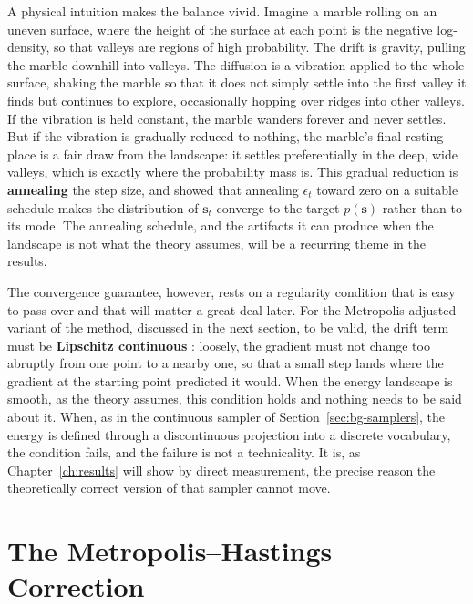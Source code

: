 A physical intuition makes the balance vivid. Imagine a marble rolling on an uneven surface, where the height of the surface at each point is the negative log-density, so that valleys are regions of high probability. The drift is gravity, pulling the marble downhill into valleys. The diffusion is a vibration applied to the whole surface, shaking the marble so that it does not simply settle into the first valley it finds but continues to explore, occasionally hopping over ridges into other valleys. If the vibration is held constant, the marble wanders forever and never settles. But if the vibration is gradually reduced to nothing, the marble's final resting place is a fair draw from the landscape: it settles preferentially in the deep, wide valleys, which is exactly where the probability mass is. This gradual reduction is \textbf{annealing} the step size, and \citet{welling2011bayesian} showed that annealing $\epsilon_t$ toward zero on a suitable schedule makes the distribution of $\bm{s}_t$ converge to the target $p(\bm{s})$ rather than to its mode. The annealing schedule, and the artifacts it can produce when the landscape is not what the theory assumes, will be a recurring theme in the results.

The convergence guarantee, however, rests on a regularity condition that is easy to pass over and that will matter a great deal later. For the Metropolis-adjusted variant of the method, discussed in the next section, to be valid, the drift term must be \textbf{Lipschitz continuous} \citep{roberts1996exponential}: loosely, the gradient must not change too abruptly from one point to a nearby one, so that a small step lands where the gradient at the starting point predicted it would. When the energy landscape is smooth, as the theory assumes, this condition holds and nothing needs to be said about it. When, as in the continuous sampler of Section~\ref{sec:bg-samplers}, the energy is defined through a discontinuous projection into a discrete vocabulary, the condition fails, and the failure is not a technicality. It is, as Chapter~\ref{ch:results} will show by direct measurement, the precise reason the theoretically correct version of that sampler cannot move.

\section{The Metropolis--Hastings Correction}
\label{sec:bg-mh}

